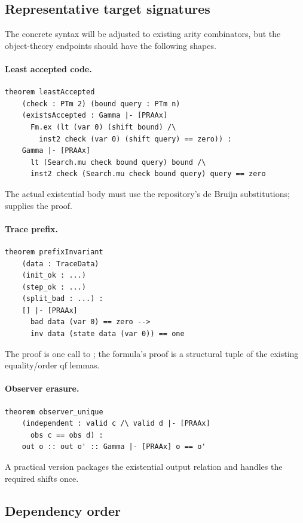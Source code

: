 \subsection{Representative target signatures}

The concrete syntax will be adjusted to existing arity combinators, but the
object-theory endpoints should have the following shapes.

\paragraph{Least accepted code.}
\begin{lstlisting}[language=Lean]
theorem leastAccepted
    (check : PTm 2) (bound query : PTm n)
    (existsAccepted : Gamma |- [PRAAx]
      Fm.ex (lt (var 0) (shift bound) /\
        inst2 check (var 0) (shift query) == zero)) :
    Gamma |- [PRAAx]
      lt (Search.mu check bound query) bound /\
      inst2 check (Search.mu check bound query) query == zero
\end{lstlisting}
The actual existential body must use the repository's de Bruijn substitutions;
 supplies the proof.

\paragraph{Trace prefix.}
\begin{lstlisting}[language=Lean]
theorem prefixInvariant
    (data : TraceData)
    (init_ok : ...)
    (step_ok : ...)
    (split_bad : ...) :
    [] |- [PRAAx]
      bad data (var 0) == zero -->
      inv data (state data (var 0)) == one
\end{lstlisting}
The proof is one call to ; the formula's  proof is a
structural tuple of the existing equality/order qf lemmas.

\paragraph{Observer erasure.}
\begin{lstlisting}[language=Lean]
theorem observer_unique
    (independent : valid c /\ valid d |- [PRAAx]
      obs c == obs d) :
    out o :: out o' :: Gamma |- [PRAAx] o == o'
\end{lstlisting}
A practical version packages the existential output relation and handles the
required shifts once.

\subsection{Dependency order}

